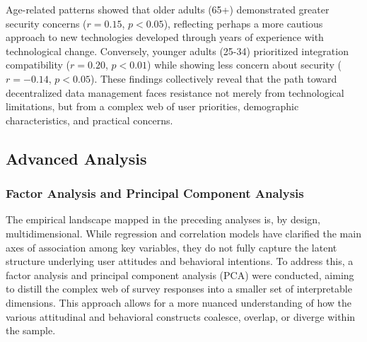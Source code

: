 		Age-related patterns showed that older adults (65+) demonstrated greater security concerns ($r = 0.15$, $p < 0.05$), reflecting perhaps a more cautious approach to new technologies developed through years of experience with technological change. Conversely, younger adults (25-34) prioritized integration compatibility ($r = 0.20$, $p < 0.01$) while showing less concern about security ($r = -0.14$, $p < 0.05$).
		These findings collectively reveal that the path toward decentralized data management faces resistance not merely from technological limitations, but from a complex web of user priorities, demographic characteristics, and practical concerns.
\subsection{Advanced Analysis}
	\subsubsection{Factor Analysis and Principal Component Analysis}
	The empirical landscape mapped in the preceding analyses is, by design, multidimensional. While regression and correlation models have clarified the main axes of association among key variables, they do not fully capture the latent structure underlying user attitudes and behavioral intentions. To address this, a factor analysis and principal component analysis (PCA) were conducted, aiming to distill the complex web of survey responses into a smaller set of interpretable dimensions. This approach allows for a more nuanced understanding of how the various attitudinal and behavioral constructs coalesce, overlap, or diverge within the sample.

